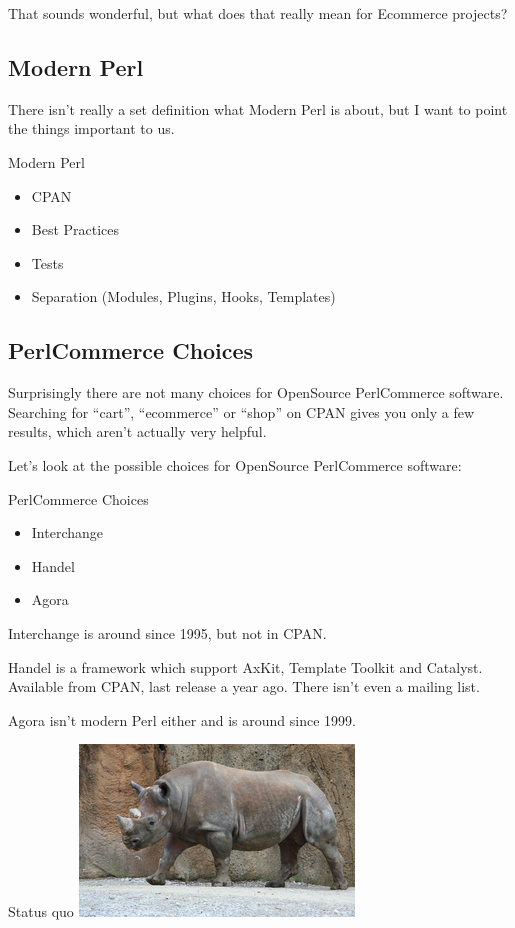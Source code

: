 That sounds wonderful, but what does that really mean for Ecommerce
projects?

\subsection{Modern Perl}
There isn't really a set definition what Modern Perl is about,
but I want to point the things important to us.

\begin{frame}{Modern Perl}
\begin{itemize}
\item CPAN
\item Best Practices
\item Tests
\item Separation (Modules, Plugins, Hooks, Templates)
\end{itemize}
\end{frame}

\subsection{PerlCommerce Choices}
Surprisingly there are not many choices for OpenSource PerlCommerce
software. Searching for ``cart'', ``ecommerce'' or ``shop'' on CPAN
gives you only a few results, which aren't actually very helpful.

Let's look at the possible choices for OpenSource PerlCommerce software:

\begin{frame}{PerlCommerce Choices}
\begin{itemize}
\item Interchange
\item Handel
\item Agora
\end{itemize}
\end{frame}

Interchange is around since 1995, but not in CPAN.

Handel is a framework which support AxKit, Template Toolkit 
and Catalyst.
Available from CPAN, last release a year ago.
There isn't even a mailing list.

Agora isn't modern Perl either and is around since 1999.

\begin{frame}{Status quo}
  \includegraphics{rhino.jpg}
\end{frame}

